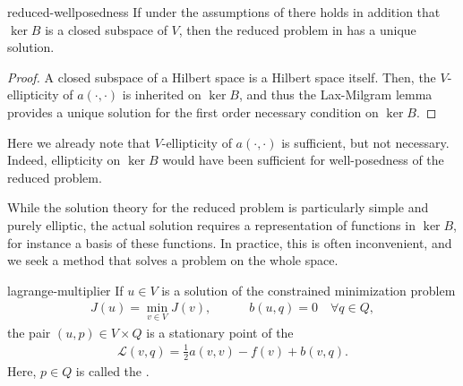 \begin{Lemma}{reduced-wellposedness}
  If under the assumptions of  there
  holds in addition that $\ker B$ is a closed subspace of $V$, then
  the reduced problem in  has a
  unique solution.
\end{Lemma}

\begin{proof}
  A closed subspace of a Hilbert space is a Hilbert space
  itself. Then, the $V$-ellipticity of $a(\cdot,\cdot)$ is inherited on
  $\ker B$, and thus the Lax-Milgram lemma provides a unique solution
  for the first order necessary condition on $\ker B$.
\end{proof}

\begin{remark}
  Here we already note that $V$-ellipticity of $a(\cdot,\cdot)$ is sufficient,
  but not necessary. Indeed, ellipticity on $\ker B$ would have been
  sufficient for well-posedness of the reduced problem.
\end{remark}

\begin{intro}
  While the solution theory for the reduced problem is particularly
  simple and purely elliptic, the actual solution requires a
  representation of functions in $\ker B$, for instance a basis of
  these functions. In practice, this is often inconvenient, and we
  seek a method that solves a problem on the whole space.
\end{intro}

\begin{Theorem}{lagrange-multiplier}
  If $u\in V$ is a solution of the constrained minimization problem
  \begin{gather}
    J(u) = \min_{v\in V} J(v), \quad\qquad
    b(u,q) = 0 \quad\forall q\in Q,
  \end{gather}
  the pair $(u,p)\in V\times Q$ is a stationary point of
  the 
  \begin{gather}
    \mathscr{L}(v,q) = \tfrac12 a(v,v) - f(v) + b(v,q).
  \end{gather}
  Here, $p\in Q$ is called the .
\end{Theorem}

